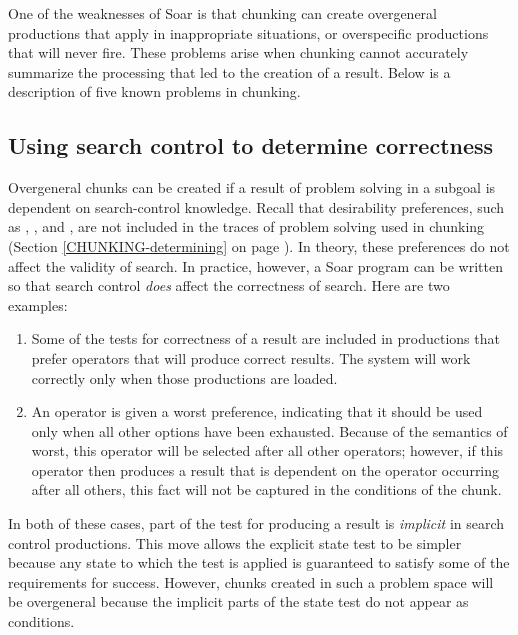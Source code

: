 
One of the weaknesses of Soar is that chunking can create overgeneral productions
that apply in inappropriate situations, or overspecific productions that will
never fire. These problems arise when chunking cannot accurately summarize the
processing that led to the creation of a result. Below is a description of
five known problems in chunking.

\subsection{Using search control to determine correctness}

Overgeneral chunks can be created if a result of problem solving in a subgoal
is dependent on search-control knowledge. Recall that desirability
preferences, such as , , and , are not
included in the traces of problem solving used in chunking (Section
\ref{CHUNKING-determining} on page \pageref{CHUNKING-determining}). In theory,
these preferences do not affect the validity of search. In practice, however,
a Soar program can be written so that search control \emph{does} affect the
correctness of search. Here are two examples:\vspace{-12pt}

\begin{enumerate} 
\item Some of the tests for correctness of a result are included in
	productions that prefer operators that will produce correct results.
  	The system will work correctly only when those productions are loaded.\vspace{-8pt}
\item An operator is given a worst preference, indicating that it
  	should be used only when all other options have been exhausted.
  	Because of the semantics of worst, this operator will be selected
  	after all other operators; however, if this operator then produces a
  	result that is dependent on the operator occurring after all others,
  	this fact will not be captured in the conditions of the chunk.
\end{enumerate}

In both of these cases, part of the test for producing a result is {\em
implicit} in search control productions. This move allows the explicit state
test to be simpler because any state to which the test is applied is
guaranteed to satisfy some of the requirements for success. However, chunks
created in such a problem space will be overgeneral because the implicit parts
of the state test do not appear as conditions. 


